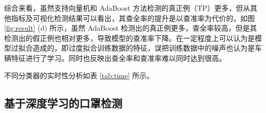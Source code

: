 \begin{table}[!ht]
\centering
\caption{不同分类器的检测结果}
\label{tab:count}
\end{table}

\begin{table}[!ht]
\centering
\caption{不同分类器的指标}
\label{tab:metric}
\end{table}

综合来看，虽然支持向量机和 AdaBoost 方法检测的真正例（TP）更多，但从其他指标及可视化检测结果可以看出，其查全率的提升是以查准率为代价的，如图 \ref{fig:result} (d) 所示，虽然 AdaBoost 检测出的真正例更多，查全率较高，但是其检测出的假正例也相对更多，导致模型的查准率下降。在一定程度上可以认为是模型过拟合造成的，即过度拟合训练数据的特征，误把训练数据中的噪声也认为是车辆特征进行了学习。同时也反映出查全率和查准率难以同时达到很高。

不同分类器的实时性分析如表 \ref{tab:time} 所示。

\begin{table}[!ht]
\centering
\caption{不同分类器的实时性比较}
\label{tab:time}
\end{table}

\subsection{基于深度学习的口罩检测}

